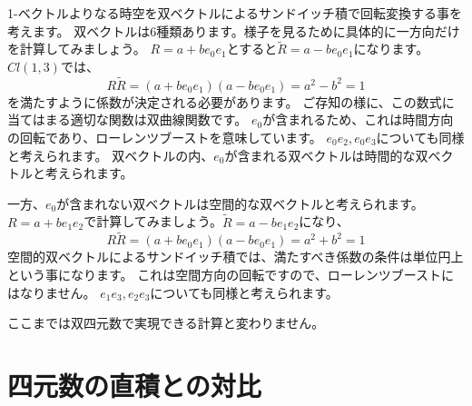 \documentclass[a4paper,12pt,notitlepage]{jsreport}
\begin{document}
1-ベクトルよりなる時空を双ベクトルによるサンドイッチ積で回転変換する事を考えます。
双ベクトルは6種類あります。様子を見るために具体的に一方向だけを計算してみましょう。
$R=a+be_0e_1$とすると$\widetilde{R}=a-be_0e_1$になります。
$Cl(1,3)$では、
\[R\widetilde{R}=(a+be_0e_1)(a-be_0e_1)=a^2-b^2=1\]
を満たすように係数が決定される必要があります。
ご存知の様に、この数式に当てはまる適切な関数は双曲線関数です。
$e_0$が含まれるため、これは時間方向の回転であり、ローレンツブーストを意味しています。
$e_0e_2,e_0e_3$についても同様と考えられます。
双ベクトルの内、$e_0$が含まれる双ベクトルは時間的な双ベクトルと考えられます。

一方、$e_0$が含まれない双ベクトルは空間的な双ベクトルと考えられます。
$R=a+be_1e_2$で計算してみましょう。$\widetilde{R}=a-be_1e_2$になり、
\[R\widetilde{R}=(a+be_0e_1)(a-be_0e_1)=a^2+b^2=1\]
空間的双ベクトルによるサンドイッチ積では、満たすべき係数の条件は単位円上という事になります。
これは空間方向の回転ですので、ローレンツブーストにはなりません。
$e_1e_3,e_2e_3$についても同様と考えられます。

ここまでは双四元数で実現できる計算と変わりません。

\section{四元数の直積との対比}
\end{document}
